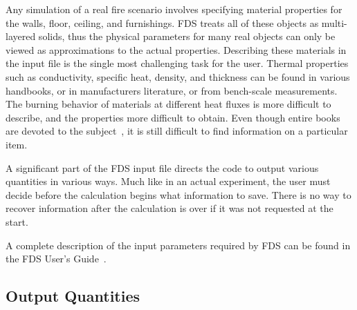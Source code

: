 \documentclass[11pt]{book}
\begin{document}
Any simulation of a real fire scenario involves specifying material properties for the walls, floor, ceiling,
and furnishings. FDS treats all of these objects as multi-layered solids, thus the physical parameters for many real
objects can only be viewed as approximations to the actual properties. Describing these materials in the input file is
the single most challenging task for the user. Thermal properties such as conductivity, specific heat,
density, and thickness can be found in various handbooks, or in manufacturers literature, or from bench-scale measurements.
The burning behavior of materials at different heat fluxes is more difficult to describe, and the properties more difficult
to obtain. Even though entire books are devoted to the
subject~\cite{Babrauskas:2}, it is still difficult to find information on a particular item.

A significant part of the FDS input file directs the code to output various quantities in various ways. Much like in an
actual experiment, the user must decide before the calculation begins what information to save. There is no way to
recover information after the calculation is over if it was not requested at the start.

A complete description of the input parameters required by FDS can be found in the FDS User's Guide~\cite{FDS_Users_Guide_5}.




\subsection{Output Quantities}
\end{document}

